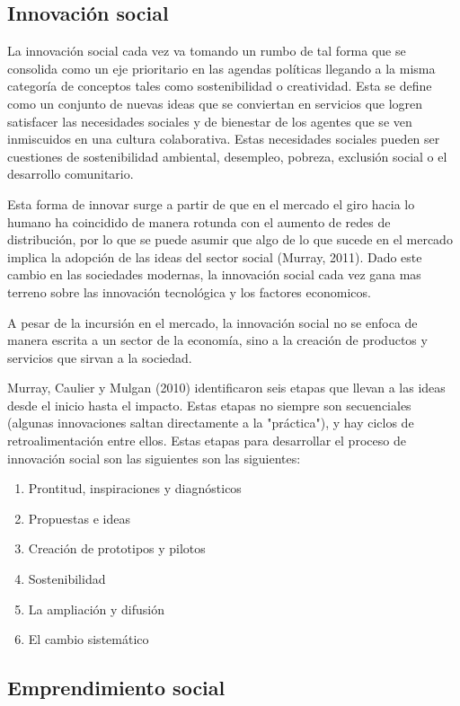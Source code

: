 \documentclass[11pt]{article}
\begin{document}
\subsection{Innovación social}
\label{sec:orgb2dcfa1}

La innovación social cada vez va tomando un rumbo de tal forma que se consolida como un eje prioritario en las agendas políticas llegando a la misma categoría de conceptos tales como sostenibilidad  o creatividad. Esta se define como un conjunto de nuevas ideas que se conviertan en servicios que logren satisfacer las necesidades sociales y de bienestar de los agentes que se ven inmiscuidos en una cultura colaborativa. Estas necesidades sociales pueden ser cuestiones de sostenibilidad ambiental, desempleo, pobreza, exclusión social o el desarrollo comunitario.

Esta forma de innovar surge a partir de que en el mercado el giro hacia lo humano ha coincidido de manera rotunda con el aumento de redes de distribución, por lo que se puede asumir que algo de lo que sucede en el mercado implica la adopción de las ideas del sector social (Murray, 2011). Dado este cambio en las sociedades modernas, la innovación social cada vez gana mas terreno sobre las innovación tecnológica y los factores economicos.

A pesar de la incursión en el mercado, la innovación social no se enfoca de manera escrita a un sector de la economía,  sino a la creación de productos y servicios que sirvan a la sociedad.

Murray,  Caulier  y  Mulgan  (2010)  identificaron  seis  etapas  que  llevan  a  las  ideas desde el inicio hasta el impacto. Estas etapas no siempre son secuenciales (algunas innovaciones saltan directamente a la "práctica"), y hay ciclos de retroalimentación entre  ellos. Estas etapas para desarrollar el proceso de innovación social son las siguientes son las siguientes:

\begin{enumerate}
\item Prontitud, inspiraciones y diagnósticos
\item Propuestas e ideas
\item Creación de prototipos y pilotos
\item Sostenibilidad
\item La ampliación y difusión
\item El cambio sistemático
\end{enumerate}


\subsection{Emprendimiento social}
\label{sec:org7efc0e4}
\end{document}
